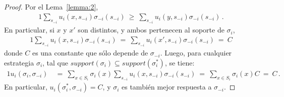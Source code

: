 \begin{proof}
Por el Lema~\ref{lemma:2},
\begin{alignat}{1}
  \sum_{s_{-i}} u_i(x,s_{-i}) \sigma_{-i}(s_{-i})\ \geq\  \sum_{s_{-i}} u_i(y,s_{-i}) \sigma_{-i}(s_{-i}) \,.
\end{alignat}
En particular, si $x$ y $x'$ son distintos, y ambos pertenecen al soporte de $\sigma_i$,
\begin{alignat}{1}
\sum_{s_{-i}} u_i(x,s_{-i}) \sigma_{-i}(s_{-i})\ =\ \sum_{s_{-i}} u_i(x',s_{-i}) \sigma_{-i}(s_{-i})\ =\ C
\end{alignat}
donde $C$ es una constante que s\'olo depende de $\sigma_{-i}$.
Luego, para cualquier estrategia $\sigma_i$, tal que $support(\sigma_i) \subseteq support(\sigma^*_i)$, se tiene:
\begin{alignat}{1}
u_i(\sigma_i, \sigma_{-i})\ &=\ \sum_{x \in S_i} \sigma_i(x) \sum_{s_{-i}} u_i(x,s_{-i}) \sigma_{-i}(s_{-i})\ =\ \sum_{x \in S_i} \sigma_i(x) C\ =\ C \,.
\end{alignat}
En particular, $u_i(\sigma^*_i,\sigma_{-i})=C$, y $\sigma_i$ es también mejor respuesta a $\sigma_{-i}$.
\end{proof}

